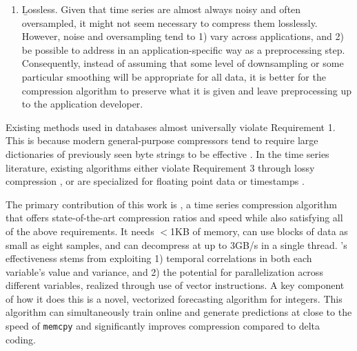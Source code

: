 \begin{enumerate}
\item \b{Lossless}. Given that time series are almost always noisy and often oversampled, it might not seem necessary to compress them losslessly. However, noise and oversampling tend to 1) vary across applications, and 2) be possible to address in an application-specific way as a preprocessing step. Consequently, instead of assuming that some level of downsampling or some particular smoothing will be appropriate for all data, it is better for the compression algorithm to preserve what it is given and leave preprocessing up to the application developer.
\end{enumerate}

Existing methods used in databases almost universally violate Requirement 1. This is because modern general-purpose compressors tend to require large dictionaries of previously seen byte strings to be effective \cite{lz4, snappy, gzip, zlib}. In the time series literature, existing algorithms either violate Requirement 3 through lossy compression \cite{sax, tsCompressSmartGrid, ecgCompressLossy, apca, lemireSegmentation}, or are specialized for floating point data \cite{gorilla} or timestamps \cite{gorilla, berkeleyTreeDB, fastpfor}.

The primary contribution of this work is \mine,
a time series compression algorithm that offers state-of-the-art compression ratios and speed while also satisfying all of the above requirements. It needs $<$1KB of memory, can use blocks of data as small as eight samples, and can decompress at up to 3GB/s in a single thread. \mine's effectiveness stems from exploiting 1) temporal correlations in both each variable's value and variance, and 2) the potential for parallelization across different variables, realized through use of vector instructions. A key component of how it does this is a novel, vectorized forecasting algorithm for integers. This algorithm can simultaneously train online and generate predictions at close to the speed of \texttt{memcpy} and significantly improves compression compared to delta coding.


